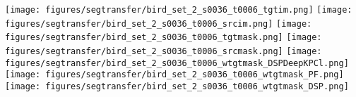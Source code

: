 \documentclass[10pt,twocolumn,letterpaper]{article}
\begin{document}
\begin{figure*}[t]
\begin{minipage}{0.538\linewidth}
\begin{center}
  \texttt{[image: figures/segtransfer/bird\_set\_2\_s0036\_t0006\_tgtim.png]}
  \texttt{[image: figures/segtransfer/bird\_set\_2\_s0036\_t0006\_srcim.png]}
  \texttt{[image: figures/segtransfer/bird\_set\_2\_s0036\_t0006\_tgtmask.png]}
  \texttt{[image: figures/segtransfer/bird\_set\_2\_s0036\_t0006\_srcmask.png]}
  \texttt{[image: figures/segtransfer/bird\_set\_2\_s0036\_t0006\_wtgtmask\_DSPDeepKPCl.png]}
  \texttt{[image: figures/segtransfer/bird\_set\_2\_s0036\_t0006\_wtgtmask\_PF.png]}
  \texttt{[image: figures/segtransfer/bird\_set\_2\_s0036\_t0006\_wtgtmask\_DSP.png]}
\\


\end{center}


\end{minipage}
\end{figure*}
\end{document}
